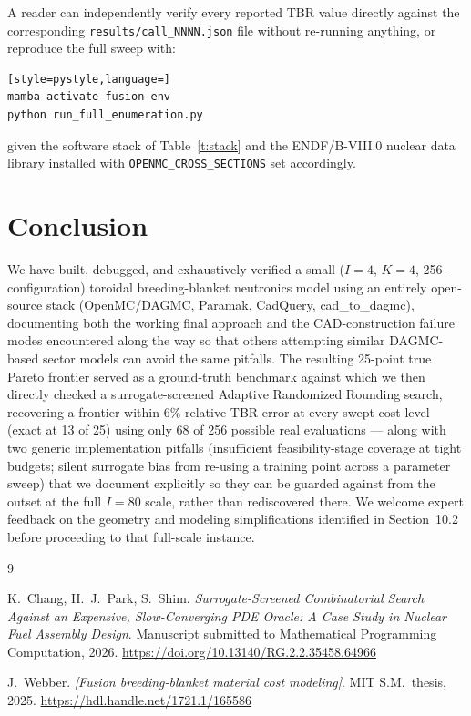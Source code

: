 \documentclass[11pt]{article}
\begin{document}
A reader can independently verify every reported TBR value directly
against the corresponding \texttt{results/call\_NNNN.json} file without
re-running anything, or reproduce the full sweep with:
\begin{lstlisting}[style=pystyle,language=]
mamba activate fusion-env
python run_full_enumeration.py
\end{lstlisting}
given the software stack of Table~\ref{t:stack} and the ENDF/B-VIII.0
nuclear data library installed with \texttt{OPENMC\_CROSS\_SECTIONS} set
accordingly.

\section{Conclusion}

We have built, debugged, and exhaustively verified a small ($I{=}4$,
$K{=}4$, 256-configuration) toroidal breeding-blanket neutronics model
using an entirely open-source stack (OpenMC/DAGMC, Paramak, CadQuery,
cad\_to\_dagmc), documenting both the working final approach and the
CAD-construction failure modes encountered along the way so that others
attempting similar DAGMC-based sector models can avoid the same pitfalls.
The resulting 25-point true Pareto frontier served as a ground-truth
benchmark against which we then directly checked a surrogate-screened
Adaptive Randomized Rounding search, recovering a frontier within 6\%
relative TBR error at every swept cost level (exact at 13 of 25) using
only 68 of 256 possible real evaluations --- along with two generic
implementation pitfalls (insufficient feasibility-stage coverage at tight
budgets; silent surrogate bias from re-using a training point across a
parameter sweep) that we document explicitly so they can be guarded
against from the outset at the full $I=80$ scale, rather than
rediscovered there. We welcome expert feedback on the geometry and
modeling simplifications identified in Section~10.2 before proceeding to
that full-scale instance.


\begin{thebibliography}{9}

K.~Chang, H.~J.~Park, S.~Shim.
\emph{Surrogate-Screened Combinatorial Search Against an Expensive,
Slow-Converging PDE Oracle: A Case Study in Nuclear Fuel Assembly Design}.
Manuscript submitted to Mathematical Programming Computation, 2026.
\url{https://doi.org/10.13140/RG.2.2.35458.64966}

J.~Webber.
\emph{[Fusion breeding-blanket material cost modeling]}.
MIT S.M.\ thesis, 2025.
\url{https://hdl.handle.net/1721.1/165586}

\end{thebibliography}
\end{document}
